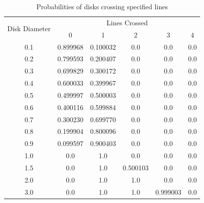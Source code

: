 \documentclass{article}
\begin{document}
\begin{table}
    \centering

    \begin{tabular}{|c||c|c|c|c|c|}
        \hline
        \multirow{2}{*}{Disk Diameter} & \multicolumn{5}{|c|}{Lines Crossed} \\
        \cline{2-6} & 0 & 1 & 2 & 3 & 4 \\
        \hline
        0.1 & 0.899968 & 0.100032 & 0.0 & 0.0 & 0.0 \\
        0.2 & 0.799593 & 0.200407 & 0.0 & 0.0 & 0.0 \\
        0.3 & 0.699829 & 0.300172 & 0.0 & 0.0 & 0.0 \\
        0.4 & 0.600033 & 0.399967 & 0.0 & 0.0 & 0.0 \\
        0.5 & 0.499997 & 0.500003 & 0.0 & 0.0 & 0.0 \\
        0.6 & 0.400116 & 0.599884 & 0.0 & 0.0 & 0.0 \\
        0.7 & 0.300230 & 0.699770 & 0.0 & 0.0 & 0.0 \\
        0.8 & 0.199904 & 0.800096 & 0.0 & 0.0 & 0.0 \\
        0.9 & 0.099597 & 0.900403 & 0.0 & 0.0 & 0.0 \\
        1.0 & 0.0 & 1.0 & 0.0 & 0.0 & 0.0 \\
        1.5 & 0.0 & 1.0 & 0.500103 & 0.0 & 0.0 \\
        2.0 & 0.0 & 1.0 & 1.0 & 0.0 & 0.0 \\
        3.0 & 0.0 & 1.0 & 1.0 & 0.999003 & 0.0 \\
        \hline

    \end{tabular}
    \caption{Probabilities of disks crossing specified lines}\label{tbl:disk}
\end{table}
\end{document}
